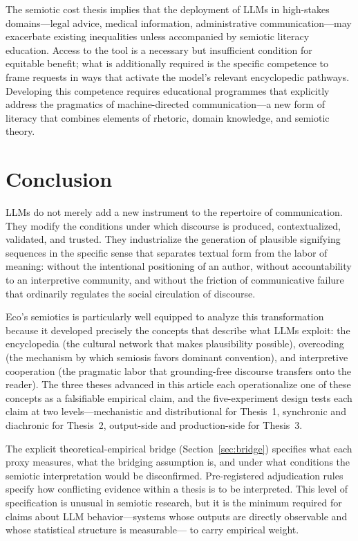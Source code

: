 \documentclass[12pt,a4paper]{article}
\begin{document}
The semiotic cost thesis implies that the deployment of LLMs in high-stakes
domains---legal advice, medical information, administrative communication---may
exacerbate existing inequalities unless accompanied by semiotic literacy
education. Access to the tool is a necessary but insufficient condition for
equitable benefit; what is additionally required is the specific competence
to frame requests in ways that activate the model's relevant encyclopedic
pathways. Developing this competence requires educational programmes that
explicitly address the pragmatics of machine-directed communication---a new
form of literacy that combines elements of rhetoric, domain knowledge, and
semiotic theory.


\section{Conclusion}
\label{sec:conclusion}

LLMs do not merely add a new instrument to the repertoire of communication.
They modify the conditions under which discourse is produced, contextualized,
validated, and trusted. They industrialize the generation of plausible
signifying sequences in the specific sense that separates textual form from
the labor of meaning: without the intentional positioning of an author,
without accountability to an interpretive community, and without the
friction of communicative failure that ordinarily regulates the social
circulation of discourse.

Eco's semiotics is particularly well equipped to analyze this transformation
because it developed precisely the concepts that describe what LLMs exploit:
the encyclopedia (the cultural network that makes plausibility possible),
overcoding (the mechanism by which semiosis favors dominant convention), and
interpretive cooperation (the pragmatic labor that grounding-free discourse
transfers onto the reader). The three theses advanced in this article each
operationalize one of these concepts as a falsifiable empirical claim, and the
five-experiment design tests each claim at two levels---mechanistic and
distributional for Thesis~1, synchronic and diachronic for Thesis~2, output-side
and production-side for Thesis~3.

The explicit theoretical-empirical bridge (Section~\ref{sec:bridge}) specifies
what each proxy measures, what the bridging assumption is, and under what
conditions the semiotic interpretation would be disconfirmed. Pre-registered
adjudication rules specify how conflicting evidence within a thesis is to be
interpreted. This level of specification is unusual in semiotic research, but
it is the minimum required for claims about LLM behavior---systems whose
outputs are directly observable and whose statistical structure is measurable---
to carry empirical weight.
\end{document}
